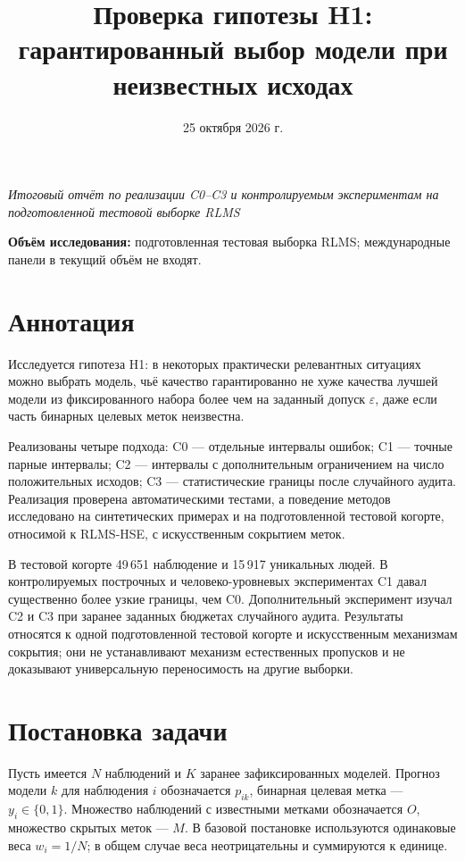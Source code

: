 \documentclass[12pt,a4paper]{article}
\title{\textbf{Проверка гипотезы H1: гарантированный выбор модели при неизвестных исходах}}
\author{}
\date{25 октября 2026 г.}
\begin{document}
\maketitle

\begin{center}
\textit{Итоговый отчёт по реализации C0--C3 и контролируемым экспериментам на подготовленной тестовой выборке RLMS}
\end{center}

\noindent\textbf{Объём исследования:} подготовленная тестовая выборка RLMS; международные панели в текущий объём не входят.

\section*{Аннотация}
Исследуется гипотеза H1: в некоторых практически релевантных ситуациях можно выбрать модель, чьё качество гарантированно не хуже качества лучшей модели из фиксированного набора более чем на заданный допуск $\varepsilon$, даже если часть бинарных целевых меток неизвестна.

Реализованы четыре подхода: C0 --- отдельные интервалы ошибок; C1 --- точные парные интервалы; C2 --- интервалы с дополнительным ограничением на число положительных исходов; C3 --- статистические границы после случайного аудита. Реализация проверена автоматическими тестами, а поведение методов исследовано на синтетических примерах и на подготовленной тестовой когорте, относимой к RLMS-HSE, с искусственным сокрытием меток.

В тестовой когорте 49\,651 наблюдение и 15\,917 уникальных людей. В контролируемых построчных и человеко-уровневых экспериментах C1 давал существенно более узкие границы, чем C0. Дополнительный эксперимент изучал C2 и C3 при заранее заданных бюджетах случайного аудита. Результаты относятся к одной подготовленной тестовой когорте и искусственным механизмам сокрытия; они не устанавливают механизм естественных пропусков и не доказывают универсальную переносимость на другие выборки.

\section{Постановка задачи}
Пусть имеется $N$ наблюдений и $K$ заранее зафиксированных моделей. Прогноз модели $k$ для наблюдения $i$ обозначается $p_{ik}$, бинарная целевая метка --- $y_i\in\{0,1\}$. Множество наблюдений с известными метками обозначается $O$, множество скрытых меток --- $M$. В базовой постановке используются одинаковые веса $w_i=1/N$; в общем случае веса неотрицательны и суммируются к единице.
\end{document}
